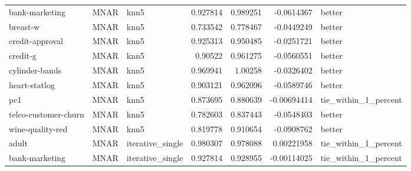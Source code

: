 \begin{table}[ht]
\begin{tabular}{lllrrrl}
 bank-marketing       & MNAR        & knn5             &                                 0.927814 &                             0.989251 &                    -0.0614367  & better               \\
 breast-w             & MNAR        & knn5             &                                 0.733542 &                             0.778467 &                    -0.0449249  & better               \\
 credit-approval      & MNAR        & knn5             &                                 0.925313 &                             0.950485 &                    -0.0251721  & better               \\
 credit-g             & MNAR        & knn5             &                                 0.90522  &                             0.961275 &                    -0.0560551  & better               \\
 cylinder-bands       & MNAR        & knn5             &                                 0.969941 &                             1.00258  &                    -0.0326402  & better               \\
 heart-statlog        & MNAR        & knn5             &                                 0.903121 &                             0.962096 &                    -0.0589746  & better               \\
 pc1                  & MNAR        & knn5             &                                 0.873695 &                             0.880639 &                    -0.00694414 & tie\_within\_1\_percent \\
 telco-customer-churn & MNAR        & knn5             &                                 0.782603 &                             0.837443 &                    -0.0548403  & better               \\
 wine-quality-red     & MNAR        & knn5             &                                 0.819778 &                             0.910654 &                    -0.0908762  & better               \\
 adult                & MNAR        & iterative\_single &                                 0.980307 &                             0.978088 &                     0.00221958 & tie\_within\_1\_percent \\
 bank-marketing       & MNAR        & iterative\_single &                                 0.927814 &                             0.928955 &                    -0.00114025 & tie\_within\_1\_percent \\

\end{tabular}
\end{table}
